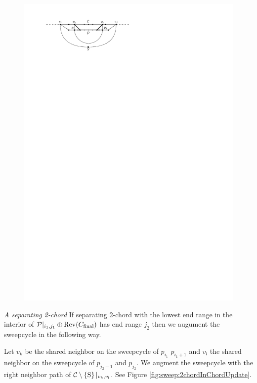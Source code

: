     \begin{figure}[h]
      \centering
      \includegraphics[scale=1]{unifiedAlgo/img/sweep/chordUpdate}
      \caption{}
      \label{fig:sweep:chordUpdate}
    \end{figure}

    \emph{A separating 2-chord}
      If separating 2-chord with the lowest end range in the interior of $\mathcal{P}|_{i_1, j_1} \oplus \operatorname{Rev}({C_\text{final}})$ has end range $j_2$ then we augument the sweepcycle in the following way.

      Let $v_k$ be the shared neighbor on the sweepcycle of $p_{i_1}$ $p_{i_1 +1}$ and $v_l$ the shared neighbor on the sweepcycle  of $p_{j_2 -1}$ and $p_{j_2}$. We augment the sweepcycle with the right neighbor path of $\mathcal{C} \setminus \left\lbrace {\mathrm{S}} \right\rbrace|_{v_k, v_l}$. See Figure \ref{fig:sweep:2chordInChordUpdate}.

